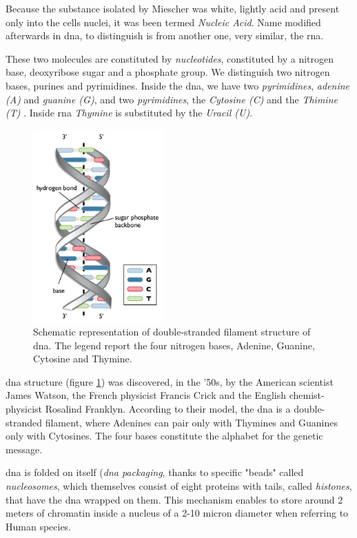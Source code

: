 Because the substance isolated by Miescher was white, lightly acid and present only into the cells nuclei, it was been termed \textit{Nucleic Acid}.
Name modified afterwards in \gls{dna}, to distinguish is from another one, very similar, the \gls{rna}.

These two molecules are constituted by \textit{nucleotides}, constituted by a nitrogen base, deoxyribose sugar and a phosphate group.
We distinguish two nitrogen bases, purines and pyrimidines.
Inside the \gls{dna}, we have two \textit{pyrimidines}, \textit{adenine (A)} and \textit{guanine (G)}, and two \textit{pyrimidines}, the \textit{Cytosine (C)} and the \textit{Thimine (T)}  .
Inside \gls{rna} \textit{Thymine} is substituted by the \textit{Uracil (U)}.

\begin{figure}[h]
\centering
\includegraphics[width=5cm, keepaspectratio]{img/intro/dna1.png}
\caption[the \gls{dna}]{Schematic representation of double-stranded filament structure of \gls{dna}. The legend report the four nitrogen bases, Adenine, Guanine, Cytosine and Thymine.}
\label{fig:dna}
\end{figure}

\gls{dna} structure (figure \ref{fig:dna}) was discovered, in the '50s, by the American scientist James Watson, the French physicist Francis Crick and the English chemist-physicist Rosalind Franklyn.
According to their model, the \gls{dna} is a double-stranded filament, where Adenines can pair only with Thymines and Guanines only with Cytosines.
The four bases constitute the alphabet for the genetic message.

\gls{dna} is folded on itself (\textit{\gls{dna} packaging}, thanks to specific "beads" called \textit{nucleosomes}, which themselves consist of eight proteins with tails, called \textit{histones}, that have the \gls{dna} wrapped on them.
This mechanism enables to store around 2 meters of chromatin inside a nucleus of a 2-10 micron diameter when referring to Human species.

